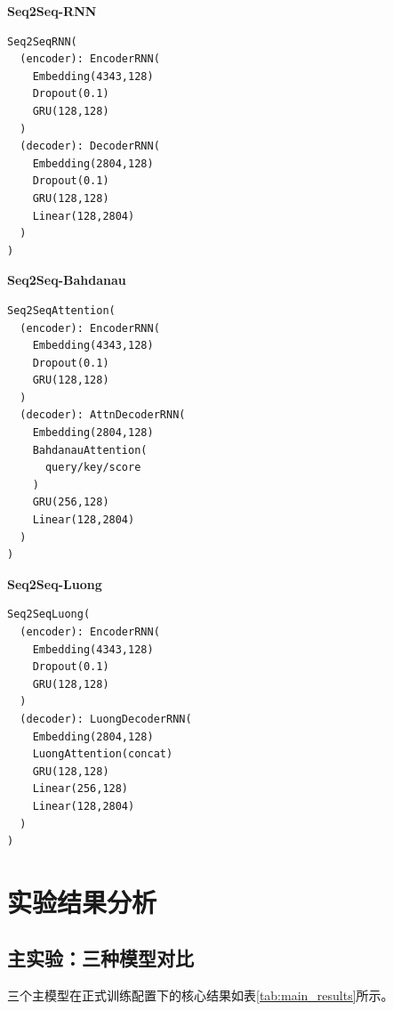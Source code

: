 \documentclass[a4paper]{article}
\begin{document}
\begin{minipage}[t]{0.40\textwidth}
\textbf{Seq2Seq-RNN}
\begin{lstlisting}
Seq2SeqRNN(
  (encoder): EncoderRNN(
    Embedding(4343,128)
    Dropout(0.1)
    GRU(128,128)
  )
  (decoder): DecoderRNN(
    Embedding(2804,128)
    Dropout(0.1)
    GRU(128,128)
    Linear(128,2804)
  )
)
\end{lstlisting}
\end{minipage}\hfill
\begin{minipage}[t]{0.40\textwidth}
\textbf{Seq2Seq-Bahdanau}
\begin{lstlisting}
Seq2SeqAttention(
  (encoder): EncoderRNN(
    Embedding(4343,128)
    Dropout(0.1)
    GRU(128,128)
  )
  (decoder): AttnDecoderRNN(
    Embedding(2804,128)
    BahdanauAttention(
      query/key/score
    )
    GRU(256,128)
    Linear(128,2804)
  )
)
\end{lstlisting}
\end{minipage}

\textbf{Seq2Seq-Luong}
\begin{lstlisting}
Seq2SeqLuong(
  (encoder): EncoderRNN(
    Embedding(4343,128)
    Dropout(0.1)
    GRU(128,128)
  )
  (decoder): LuongDecoderRNN(
    Embedding(2804,128)
    LuongAttention(concat)
    GRU(128,128)
    Linear(256,128)
    Linear(128,2804)
  )
)
\end{lstlisting}

\section{实验结果分析}
\subsection{主实验：三种模型对比}
三个主模型在正式训练配置下的核心结果如表\ref{tab:main_results}所示。

\begin{table}[H]
    \centering
    \small
    \caption{三种主模型的测试结果对比}
    \label{tab:main_results}
\end{table}
\end{document}
